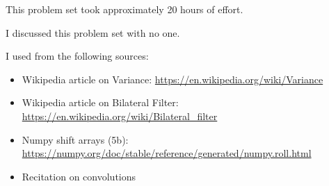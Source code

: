 \documentclass{article}
\begin{document}
This problem set took approximately 20 hours of effort.

I discussed this problem set with no one.

I used from the following sources:
\begin{itemize}
\item Wikipedia article on Variance: \url{https://en.wikipedia.org/wiki/Variance}
\item Wikipedia article on Bilateral Filter: \url{https://en.wikipedia.org/wiki/Bilateral_filter}
\item Numpy shift arrays (5b): \url{https://numpy.org/doc/stable/reference/generated/numpy.roll.html}
\item Recitation on convolutions
\end{itemize}
\end{document}
